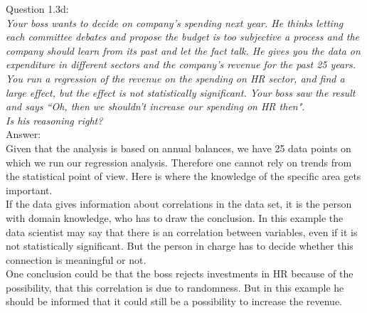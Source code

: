 
Question 1.3d:\\	
\textsl{Your boss wants to decide on company's spending next year. He thinks letting each committee debates and propose the budget is too subjective a process and the company should learn from its past and let the fact talk. He gives you the data on expenditure in different sectors and the company's revenue for the past 25 years. You run a regression of the revenue on the spending on HR sector, and find a large effect, but the effect is not statistically significant. Your boss saw the result and says “Oh, then we shouldn't increase our spending on HR then".}\\
	
\textsl{Is his reasoning right?}\\

Answer:\\
Given that the analysis is based on annual balances, we have 25 data points on which we run our regression analysis. Therefore one cannot rely on trends from the statistical point of view. Here is where the knowledge of the specific area gets important.\\

If the data gives information about correlations in the data set, it is the person with domain knowledge, who has to draw the conclusion. In this example the data scientist may say that there is an correlation between variables, even if it is not statistically significant. But the person in charge has to decide whether this connection is meaningful or not.\\

One conclusion could be that the boss rejects investments in HR because of the possibility, that this correlation is due to randomness. But in this example he should be informed that it could still be a possibility to increase the revenue.\\




